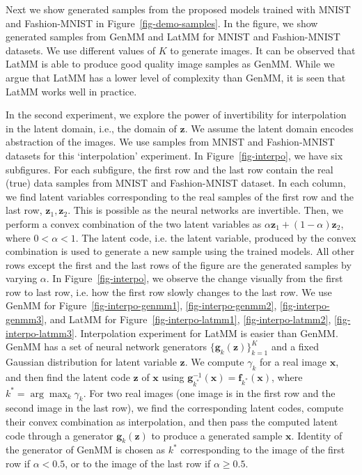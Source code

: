 Next we show generated samples from the proposed models trained with MNIST and Fashion-MNIST in Figure~\ref{fig-demo-samples}. In the figure, we show generated samples from GenMM and LatMM for MNIST and Fashion-MNIST datasets. We use different values of $K$ to generate images. It can be observed that LatMM is able to produce good quality image samples as GenMM. While we argue that LatMM has a lower level of complexity than GenMM, it is seen that LatMM works well in practice.    

In the second experiment, we explore the power of invertibility for interpolation in the latent domain, i.e., the domain of $\bm{z}$. We assume the latent domain encodes abstraction of the images. We use samples from MNIST and Fashion-MNIST datasets for this `interpolation' experiment. In Figure~\ref{fig-interpo}, we have six subfigures. For each subfigure, the first row and the last row contain the real (true) data samples from MNIST and Fashion-MNIST dataset. In each column, we find latent variables corresponding to the real samples of the first row and the last row, $\bm{z}_1, \bm{z}_2$. This is possible as the neural networks are invertible. Then, we perform a convex combination of the two latent variables as $\alpha \bm{z}_1 + (1- \alpha)\bm{z}_2$, where $0 < \alpha <1$. The latent code, i.e. the latent variable, produced by the convex combination is used to generate a new sample using the trained models. All other rows except the first and the last rows of the figure are the generated samples by varying $\alpha$. In Figure~\ref{fig-interpo}, we observe the change visually from the first row to last row, i.e. how the first row slowly changes to the last row. We use GenMM for Figure~\ref{fig-interpo-genmm1}, \ref{fig-interpo-genmm2}, \ref{fig-interpo-genmm3}, and LatMM for Figure~\ref{fig-interpo-latmm1}, \ref{fig-interpo-latmm2}, \ref{fig-interpo-latmm3}. Interpolation experiment for LatMM is easier than GenMM. GenMM has a set of neural network generators $\{ \bm{g}_k(\bm{z}) \}_{k=1}^K$ and a fixed Gaussian distribution for latent variable $\bm{z}$. We compute $\gamma_k$ for a real image $\bm{x}$, and then find the latent code $\bm{z}$ of $\bm{x}$ using $\bm{g}_{k^{*}}^{-1}(\bm{x})=\bm{f}_{k^{*}}(\bm{x})$, where $k^{*} = \arg \max_{k} \gamma_k$. For two real images (one image is in the first row and the second image in the last row), we find the corresponding latent codes, compute their convex combination as interpolation, and then pass the computed latent code through a generator $\bm{g}_k(\bm{z})$ to produce a generated sample $\bm{x}$. Identity of the generator of GenMM is chosen as $k^{*}$ corresponding to the image of the first row if $\alpha < 0.5$, or to the image of the last row if $\alpha \geq 0.5$.

